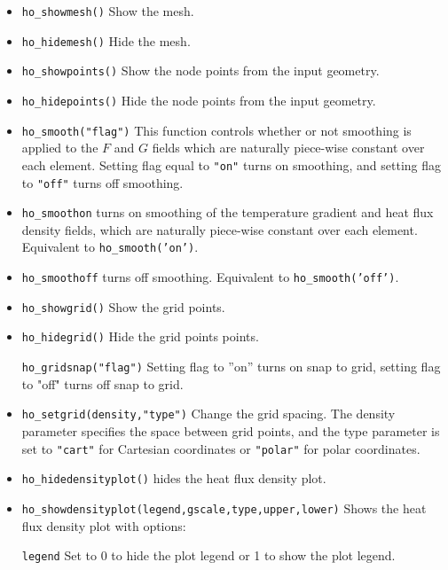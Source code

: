 \begin{itemize}
\item \texttt{ho\_showmesh()} Show the mesh.

\item \texttt{ho\_hidemesh()} Hide the mesh.

\item \texttt{ho\_showpoints()} Show the node points from the input geometry.

\item \texttt{ho\_hidepoints()} Hide the node points from the input geometry.

\item \texttt{ho\_smooth("flag")} This function controls whether or not smoothing is
applied to the $F$ and $G$ fields which are naturally piece-wise
constant over each element. Setting flag equal to \texttt{"on"}
turns on smoothing, and setting flag to \texttt{"off"} turns off
smoothing.

\item{\tt ho\_smoothon} turns on smoothing of the temperature gradient and heat flux density fields, which are naturally piece-wise constant over each element. Equivalent to {\tt ho\_smooth('on')}.

\item{\tt ho\_smoothoff} turns off smoothing. Equivalent to {\tt ho\_smooth('off')}.

\item \texttt{ho\_showgrid()} Show the grid points.

\item \texttt{ho\_hidegrid()} Hide the grid points points.

\texttt{ho\_gridsnap("flag")} Setting flag to ''on'' turns on snap to grid,
setting flag to "off" turns off snap to grid.

\item \texttt{ho\_setgrid(density,"type")} Change the grid spacing. The density
parameter specifies the space between grid points, and the type
parameter is set to \texttt{"cart"} for Cartesian coordinates or
\texttt{"polar"} for polar coordinates.

\item \texttt{ho\_hidedensityplot()} hides the heat flux density plot.

\item \texttt{ho\_showdensityplot(legend,gscale,type,upper,lower)} Shows the
heat flux density plot with options:

\texttt{legend} Set to 0 to hide the plot legend or 1 to show the plot
legend.


\end{itemize}
